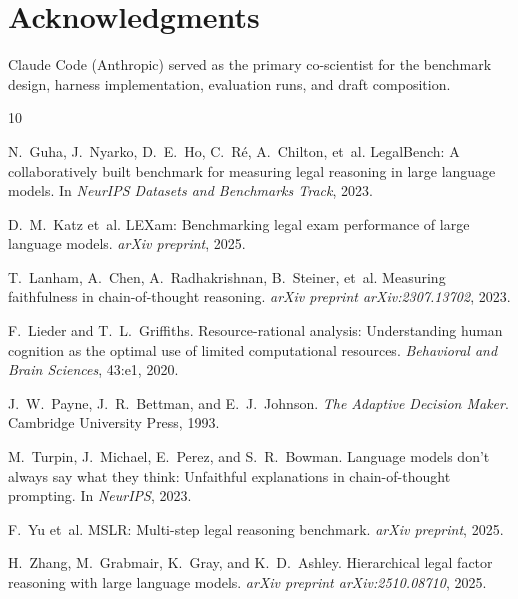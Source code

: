 \documentclass[11pt,twocolumn]{article}
\begin{document}
\section*{Acknowledgments}

Claude Code (Anthropic) served as the primary co-scientist for the benchmark design, harness implementation, evaluation runs, and draft composition.



\begin{thebibliography}{10}

N.~Guha, J.~Nyarko, D.~E.~Ho, C.~R\'{e}, A.~Chilton, et~al.
\newblock LegalBench: A collaboratively built benchmark for measuring legal reasoning in large language models.
\newblock In \emph{NeurIPS Datasets and Benchmarks Track}, 2023.

D.~M.~Katz et~al.
\newblock LEXam: Benchmarking legal exam performance of large language models.
\newblock \emph{arXiv preprint}, 2025.

T.~Lanham, A.~Chen, A.~Radhakrishnan, B.~Steiner, et~al.
\newblock Measuring faithfulness in chain-of-thought reasoning.
\newblock \emph{arXiv preprint arXiv:2307.13702}, 2023.

F.~Lieder and T.~L.~Griffiths.
\newblock Resource-rational analysis: Understanding human cognition as the optimal use of limited computational resources.
\newblock \emph{Behavioral and Brain Sciences}, 43:e1, 2020.

J.~W.~Payne, J.~R.~Bettman, and E.~J.~Johnson.
\newblock \emph{The Adaptive Decision Maker}.
\newblock Cambridge University Press, 1993.

M.~Turpin, J.~Michael, E.~Perez, and S.~R.~Bowman.
\newblock Language models don't always say what they think: Unfaithful explanations in chain-of-thought prompting.
\newblock In \emph{NeurIPS}, 2023.

F.~Yu et~al.
\newblock MSLR: Multi-step legal reasoning benchmark.
\newblock \emph{arXiv preprint}, 2025.

H.~Zhang, M.~Grabmair, K.~Gray, and K.~D.~Ashley.
\newblock Hierarchical legal factor reasoning with large language models.
\newblock \emph{arXiv preprint arXiv:2510.08710}, 2025.

\end{thebibliography}
\end{document}
